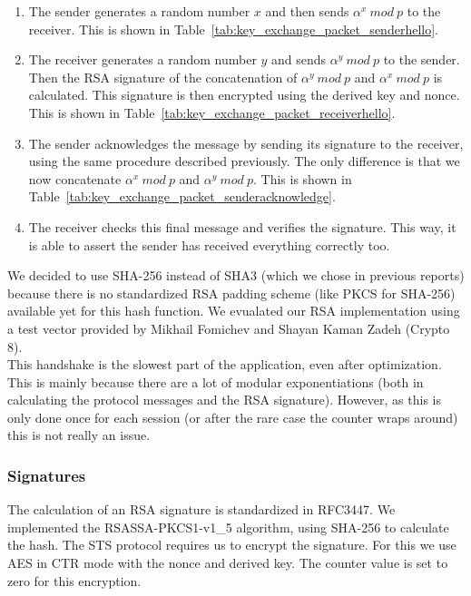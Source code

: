 \documentclass[a4paper]{article}
\begin{document}
\begin{enumerate}
    \item The sender generates a random number $x$ and then sends $\alpha^x\ mod\ p$ to the receiver. This is shown in Table~\ref{tab:key_exchange_packet_senderhello}.
    \item The receiver generates a random number $y$ and sends $\alpha^y\ mod\ p$ to the sender. Then the RSA signature of the concatenation of $\alpha^y\ mod\ p$ and $\alpha^x\ mod\ p$ is calculated. This signature is then encrypted using the derived key and nonce. This is shown in Table~\ref{tab:key_exchange_packet_receiverhello}.
    \item The sender acknowledges the message by sending its signature to the receiver, using the same procedure described previously. The only difference is that we now concatenate $\alpha^x\ mod\ p$ and $\alpha^y\ mod\ p$. This is shown in Table~\ref{tab:key_exchange_packet_senderacknowledge}.
    \item The receiver checks this final message and verifies the signature. This way, it is able to assert the sender has received everything correctly too.
\end{enumerate}

We decided to use SHA-256 instead of SHA3 (which we chose in previous reports) because there is no standardized RSA padding scheme (like PKCS for SHA-256) available yet for this hash function. We evualated our RSA implementation using a test vector provided by Mikhail Fomichev and Shayan Kaman Zadeh (Crypto 8).\\

This handshake is the slowest part of the application, even after optimization. This is mainly because there are a lot of modular exponentiations (both in calculating the protocol messages and the RSA signature). However, as this is only done once for each session (or after the rare case the counter wraps around) this is not really an issue.

\subsubsection{Signatures}

The calculation of an RSA signature is standardized in RFC3447. We implemented the RSASSA-PKCS1-v1\_5 algorithm, using SHA-256 to calculate the hash. The STS protocol requires us to encrypt the signature. For this we use AES in CTR mode with the nonce and derived key. The counter value is set to zero for this encryption.\\
\end{document}
